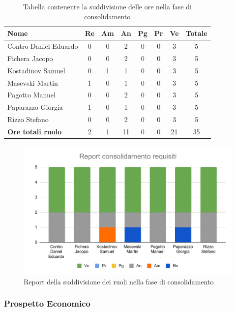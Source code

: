 \documentclass[../piano_di_progetto.tex]{subfiles}
\begin{document}
\begin{table}[!ht]

	\centering
	\begin{tabular}{|l|c|c|c|c|c|c|c|}
	\hline
	\rowcolor{lightgray}
	\textbf{Nome} & \textbf{Re} & \textbf{Am} & \textbf{An} & \textbf{Pg}  & \textbf{Pr}   & \textbf{Ve} & \textbf{Totale} \\
	\hline
		Contro Daniel Eduardo & 0 & 0 & 2 & 0 & 0 & 3  & 5 \\
		Fichera Jacopo & 0 & 0 & 2 & 0 & 0 & 3 & 5 \\
		Kostadinov Samuel & 0 & 1 & 1 & 0 & 0 & 3 & 5 \\			
		Masevski Martin & 1 & 0 & 1 & 0 & 0 & 3 & 5 \\
		Pagotto Manuel & 0 & 0 & 2 & 0 & 0 & 3 & 5 \\			
		Paparazzo Giorgia & 1 & 0 & 1 & 0 & 0 & 3 & 5 \\
		Rizzo Stefano & 0 & 0 & 2 & 0 & 0 & 3 & 5 \\
		\hline
		\textbf{Ore totali ruolo} & 2 & 1 & 11 & 0 & 0 & 21 & 35 \\
	\hline	
	\end{tabular}
	\caption{Tabella contenente la suddivisione delle ore nella fase di consolidamento}
\end{table}

\begin{figure}[H]
\centering
\includegraphics[width=12cm]{src/img/report/report_consolidamento.pdf}
\caption{Report della suddivisione dei ruoli nella fase di consolidamento}
\end{figure}

\subsubsection{Prospetto Economico}
\end{document}
